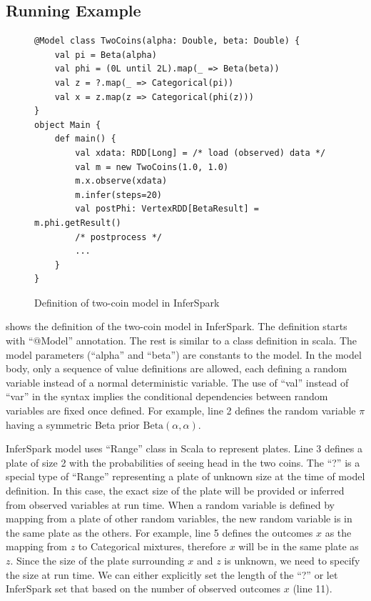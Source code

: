 \subsection{Running Example}

\begin{figure}[h]
\begin{lstlisting}
@Model class TwoCoins(alpha: Double, beta: Double) {
	val pi = Beta(alpha)
	val phi = (0L until 2L).map(_ => Beta(beta))
	val z = ?.map(_ => Categorical(pi))
	val x = z.map(z => Categorical(phi(z)))
}
object Main {
	def main() {
		val xdata: RDD[Long] = /* load (observed) data */
		val m = new TwoCoins(1.0, 1.0)
		m.x.observe(xdata)
		m.infer(steps=20)
		val postPhi: VertexRDD[BetaResult] = m.phi.getResult()
		/* postprocess */
		...
	}
}
\end{lstlisting}
\caption{Definition of two-coin model in InferSpark}
\label{fig:two_coins_modeldef}
\end{figure}

 shows the definition of the two-coin model
in InferSpark. The definition starts with ``{\sf @Model}'' annotation. 
The rest is similar to a class definition in
scala. The model parameters (``{\sf alpha}'' and ``{\sf beta}'') are constants to the
model. In the model body, only a sequence of value definitions are allowed,
each defining a random variable instead of a normal deterministic variable. 
The use of ``{\sf val}'' instead of ``{\sf var}'' in the syntax 
implies the conditional dependencies between random variables are fixed 
once defined. For example, line
2 defines the random variable $\pi$ having a symmetric Beta prior
$\mathrm{Beta}(\alpha, \alpha)$.

InferSpark model uses ``Range'' class in Scala to represent plates. Line 3
defines a plate of size 2 with the probabilities of seeing head in the 
two coins. The ``?'' is a special type of ``Range'' representing 
a plate of unknown size at the time of model definition. 
In this case, the exact size of the plate will be provided or inferred
from observed variables at run time.  When a random variable is
defined by mapping from a plate of other random variables, 
the new random variable is in the same plate as the others.  
For example, line 5 defines the outcomes $x$ as the mapping from $z$ 
to Categorical mixtures, therefore $x$ will be in the same plate as
$z$. Since the size of the plate surrounding $x$ and $z$ is unknown, we need
to specify the size at run time.  We can either explicitly set the length of
the ``?'' or let InferSpark set that based on the number of observed outcomes
$x$ (line 11).

